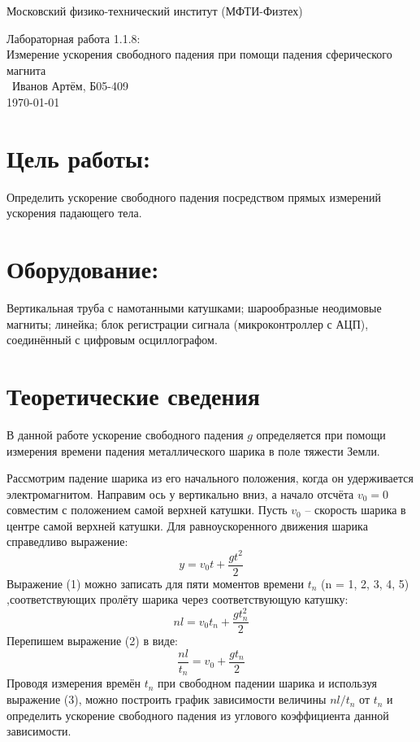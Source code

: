 \documentclass[12pt]{article}
\begin{document}
\begin{titlepage}


\begin{center}
 {\large Московский физико-технический институт (МФТИ-Физтех)}
\vspace{9cm}

{\Large Лабораторная работа 1.1.8:\\ Измерение ускорения свободного падения при помощи падения сферического магнита} \\[0.5cm] %
\ Иванов Артём, Б05-409\\[0.5cm]
\today
\end{center}
\end{titlepage}

\newpage

\section{Цель работы:}
Определить ускорение свободного падения посредством прямых измерений ускорения падающего тела.

\section{Оборудование:}
Вертикальная труба с намотанными катушками; шарообразные
неодимовые магниты; линейка; блок регистрации сигнала (микроконтроллер с АЦП), соединённый с цифровым осциллографом.

\section{Теоретические сведения}
В данной работе ускорение свободного падения $g$ определяется при помощи измерения времени падения металлического шарика в поле тяжести Земли.

Рассмотрим падение шарика из его начального положения, когда он удерживается электромагнитом. Направим ось у вертикально вниз, а начало отсчёта  $v_0 = 0$ совместим с положением самой верхней катушки.
Пусть $v_0$ – скорость шарика в центре самой верхней катушки. Для равноускоренного движения шарика справедливо выражение:
\begin{equation}\label{сигма}
y = v_0 t + \frac{gt^2}{2}
\end{equation}
Выражение (1) можно записать для пяти моментов времени $t_n$ (n = 1, 2, 3, 4, 5) ,соответствующих пролёту шарика через соответствующую катушку:
\begin{equation}\label{сигма}
nl = v_0 t_n + \frac{gt_n^2}{2}
\end{equation}
Перепишем выражение (2) в виде:
\begin{equation}\label{сигма}
\frac{nl}{t_n} = v_0 + \frac{gt_n}{2}
\end{equation}
\newpage
Проводя измерения времён $t_n$ при свободном падении шарика и используя выражение (3), можно построить график зависимости величины $nl/t_n$ от $t_n$ и определить ускорение свободного падения из углового коэффициента данной зависимости.\\
\end{document}
